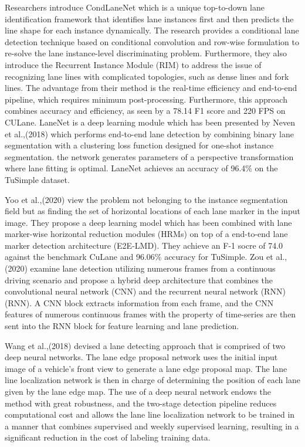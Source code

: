 Researchers\cite{liu_condlanenet_2021} introduce CondLaneNet which is a unique top-to-down lane identification framework that identifies lane instances first and then predicts the line shape for each instance dynamically. The research provides a conditional lane detection technique based on conditional convolution and row-wise formulation to re-solve the lane instance-level discriminating problem. Furthermore, they also introduce the Recurrent Instance Module (RIM) to address the issue of recognizing lane lines with complicated topologies, such as dense lines and fork lines. The advantage from their method is the real-time efficiency and end-to-end pipeline, which requires minimum post-processing. Furthermore, this approach combines accuracy and efficiency, as seen by a 78.14 F1 score and 220 FPS on CULane\cite{CULane_Dataset}. LaneNet is a deep learning module which has been presented by Neven et al.,(2018)\cite{neven_towards_2018} which performs end-to-end lane detection by combining binary lane segmentation with a clustering loss function designed for one-shot instance segmentation. the network generates parameters of a perspective transformation where lane fitting is optimal. LaneNet achieves an accuracy of 96.4\% on the TuSimple dataset.      

Yoo et al.,(2020)\cite{yoo_end--end_2020} view the problem not belonging to the instance segmentation field but as finding the set of horizontal locations of each lane marker in the input image. They propose a deep learning model which has been combined with lane marker-wise horizontal reduction modules (HRMs) on top of a end-to-end lane marker detection architecture (E2E-LMD). They achieve an F-1 socre of 74.0 against the benchmark CuLane and 96.06\% accuracy for TuSimple. Zou et al.,(2020)\cite{zou_robust_2020} examine lane detection utilizing numerous frames from a continuous driving scenario and propose a hybrid deep architecture that combines the convolutional neural network (CNN) and the recurrent neural network (RNN) (RNN). A CNN block extracts information from each frame, and the CNN features of numerous continuous frames with the property of time-series are then sent into the RNN block for feature learning and lane prediction.

Wang et al.,(2018)\cite{wang_lanenet_2018} devised a lane detecting approach that is comprised of two deep neural networks. The lane edge proposal network uses the initial input image of a vehicle's front view to generate a lane edge proposal map. The lane line localization network is then in charge of determining the position of each lane given by the lane edge map. The use of a deep neural network endows the method with great robustness, and the two-stage detection pipeline reduces computational cost and allows the lane line localization network to be trained in a manner that combines supervised and weekly supervised learning, resulting in a significant reduction in the cost of labeling training data.